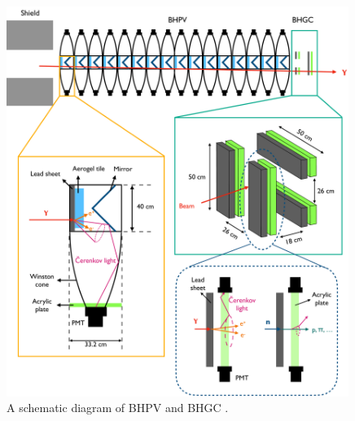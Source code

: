 


\begin{figure}[h]
\begin{center}
\captionsetup{width=.99\linewidth}
\includegraphics[width=0.99\textwidth]{Figures/Chapter3/BHPV_BHGC.pdf}
\caption{A schematic diagram of BHPV and BHGC \parencite{BHPV, BHGC}.}
\label{fig:BHPV_BHGC}
\end{center}
\end{figure}

